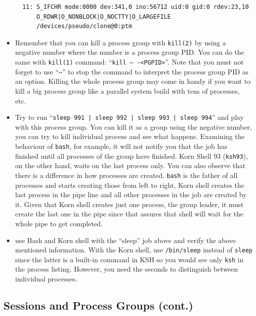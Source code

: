 \begin{itemize}
\begin{verbatim}
  11: S_IFCHR mode:0000 dev:341,0 ino:56712 uid:0 gid:0 rdev:23,10
      O_RDWR|O_NONBLOCK|O_NOCTTY|O_LARGEFILE
      /devices/pseudo/clone@0:ptm
\end{verbatim}
\item Remember that you can kill a process group with \texttt{kill(2)} by using
a negative number where the number is a process group PID. You can do the same
with \texttt{kill(1)} command: ``\texttt{kill -- -<PGPID>}''. Note that you must
not forget to use ``\texttt{--}'' to stop the command to interpret the process
group PID as an option. Killing the whole process group may come in handy if you
want to kill a big process group like a parallel system build with tens of
processes, etc.
\item \label{BASH_KSH} Try to run ``\texttt{sleep 991 | sleep 992 | sleep 993 |
sleep 994}'' and play with this process group. You can kill it as a group using
the negative number, you can try to kill individual process and see what
happens. Examining the behaviour of \texttt{bash}, for example, it will not
notify you that the job has finished until all processes of the group have
finished. Korn Shell 93 (\texttt{ksh93}), on the other hand, waits on the last
process only. You can also observe that there is a difference in how processes
are created. \texttt{bash} is the father of all processes and starts creating
those from left to right, Korn shell creates the last process in the pipe line
and all other processes in the job are created by it. Given that Korn shell
creates just one process, the group leader, it must create the last one in the
pipe since that assures that shell will wait for the whole pipe to get
completed.
\item {} use Bash and Korn shell with the ``sleep'' job above and
verify the above mentioned information. With the Korn shell, use
\texttt{/bin/sleep} instead of \texttt{sleep} since the latter is a built-in
command in KSH so you would see only \texttt{ksh} in the process listing.
However, you need the seconds to distinguish between individual processes.
\end{itemize}

\subsection{Sessions and Process Groups (cont.)}

